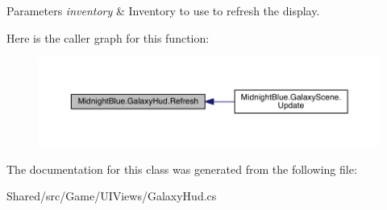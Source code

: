 \begin{DoxyParams}{Parameters}
{\em inventory} & Inventory to use to refresh the display.\\
\hline
\end{DoxyParams}
Here is the caller graph for this function\+:\nopagebreak
\begin{figure}[H]
\begin{center}
\leavevmode
\includegraphics[width=350pt]{class_midnight_blue_1_1_galaxy_hud_aea2d04b212188a2e729ea327b7da0449_icgraph}
\end{center}
\end{figure}


The documentation for this class was generated from the following file\+:\begin{DoxyCompactItemize}
\item 
Shared/src/\+Game/\+U\+I\+Views/Galaxy\+Hud.\+cs\end{DoxyCompactItemize}
